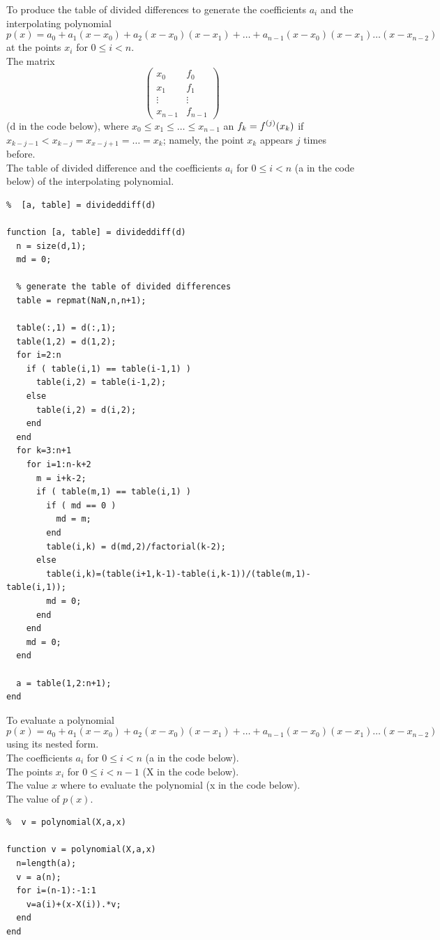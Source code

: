 \begin{code}
To produce the table of divided differences to generate the coefficients
$a_i$ and the interpolating polynomial
\[
  p(x) = a_0 + a_1(x-x_0) + a_2(x-x_0)(x-x_1) + \ldots
  + a_{n-1}(x-x_0)(x-x_1)\ldots(x-x_{n-2})
\]
at the points $x_i$ for $0 \leq i < n$.\\
 The matrix
\[
  \begin{pmatrix}
    x_0 & f_0 \\
    x_1 & f_1 \\
    \vdots & \vdots \\
    x_{n-1} & f_{n-1}
  \end{pmatrix}
\]
(d in the code below), where $x_0 \leq x_1 \leq \ldots \leq x_{n-1}$ an
$\displaystyle f_k = f^{(j)}(x_k)$ if
$x_{k-j-1} < x_{k-j} = x_{x-j+1} = \ldots = x_k$;
namely, the point $x_k$ appears $j$ times before. \\
 The table of divided difference and the coefficients 
$a_i$ for $0\leq i < n$ (a in the code below) of the interpolating
polynomial.
\small
\begin{verbatim}
%  [a, table] = divideddiff(d)

function [a, table] = divideddiff(d)
  n = size(d,1);
  md = 0;
  
  % generate the table of divided differences
  table = repmat(NaN,n,n+1);

  table(:,1) = d(:,1);
  table(1,2) = d(1,2);
  for i=2:n
    if ( table(i,1) == table(i-1,1) )
      table(i,2) = table(i-1,2);
    else
      table(i,2) = d(i,2);
    end
  end
  for k=3:n+1
    for i=1:n-k+2
      m = i+k-2;
      if ( table(m,1) == table(i,1) )
        if ( md == 0 )
          md = m;
        end
        table(i,k) = d(md,2)/factorial(k-2);
      else 
        table(i,k)=(table(i+1,k-1)-table(i,k-1))/(table(m,1)-table(i,1));
        md = 0;
      end
    end
    md = 0;
  end

  a = table(1,2:n+1);
end
\end{verbatim}
\end{code}

\begin{code}
To evaluate a polynomial
\[
  p(x) = a_0 + a_1(x-x_0) + a_2(x-x_0)(x-x_1) + \ldots
  + a_{n-1}(x-x_0)(x-x_1)\ldots(x-x_{n-2})
\]
using its nested form.\\
The coefficients $a_i$ for $0 \leq i < n$ (a in the code below).\\
The points $x_i$ for $0 \leq i < n-1$ (X in the code below).\\
The value $x$ where to evaluate the polynomial (x in the code below).\\
 The value of $p(x)$.
\small
\begin{verbatim}
%  v = polynomial(X,a,x)

function v = polynomial(X,a,x)
  n=length(a);
  v = a(n);
  for i=(n-1):-1:1
    v=a(i)+(x-X(i)).*v;
  end
end
\end{verbatim}
\end{code}

